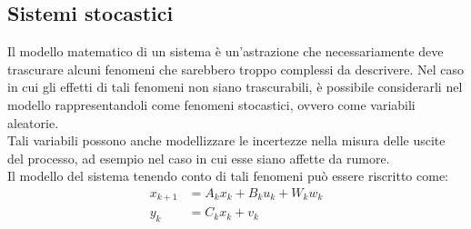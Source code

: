 \subsection{Sistemi stocastici}
Il modello matematico di un sistema è un'astrazione che necessariamente deve trascurare alcuni fenomeni che sarebbero troppo complessi da descrivere. Nel caso in cui gli effetti di tali fenomeni non siano trascurabili, è possibile considerarli nel modello rappresentandoli come fenomeni stocastici, ovvero come variabili aleatorie.\\
Tali variabili possono anche modellizzare le incertezze nella misura delle uscite del processo, ad esempio nel caso in cui esse siano affette da rumore.\\
Il modello del sistema tenendo conto di tali fenomeni può essere riscritto come:
\begin{subequations}
\label{rumlinsys}
\begin{align}\label{rumlinsys1}
x_{k+1} &= A_kx_k + B_ku_k + W_kw_k \\
\label{rumlinsys2}
y_k &= C_kx_k + v_k
\end{align}
\end{subequations}

